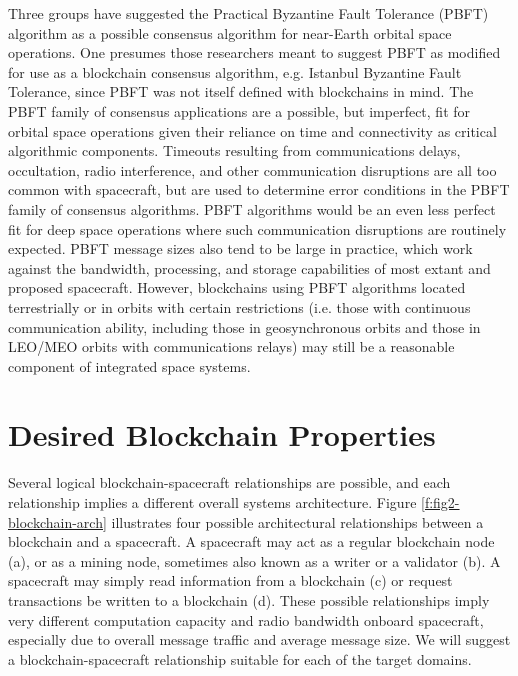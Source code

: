 \documentclass[]{aiaa-tc}%
\begin{document}
Three groups have suggested the Practical Byzantine Fault Tolerance (PBFT) algorithm\cite{castro_practical_1999} as a possible consensus algorithm for near-Earth orbital space operations\cite{yu_blockchain_2019,molesky_blockchain_2018,mital_blockchain_2019}. One presumes those researchers meant to suggest PBFT as modified for use as a blockchain consensus algorithm, e.g. Istanbul Byzantine Fault Tolerance\cite{lin_istanbul_2017}, since PBFT was not itself defined with blockchains in mind. The PBFT family of consensus applications are a 
possible, but imperfect, fit for orbital space operations given their reliance on time and connectivity as critical algorithmic components. Timeouts resulting from communications delays, occultation, radio interference, and other communication disruptions are all too common with spacecraft, but are used to determine error conditions in the PBFT family of consensus algorithms. PBFT algorithms would be an even less perfect fit for deep space operations where such communication disruptions are routinely expected. PBFT message sizes also tend to be large in practice, which work against the bandwidth, processing, and storage capabilities of most extant and proposed spacecraft. However, blockchains using PBFT algorithms located terrestrially or in orbits with certain restrictions (i.e. those with continuous communication ability, including those in geosynchronous orbits and those in LEO/MEO orbits with communications relays) may still be a reasonable component of integrated space systems.


\section{Desired Blockchain Properties}\label{sec:desiredproperties}

Several logical blockchain-spacecraft relationships are possible, and each relationship implies a different overall systems architecture. Figure \ref{f:fig2-blockchain-arch} illustrates four possible architectural relationships between a blockchain and a spacecraft. A spacecraft may act as a regular blockchain node (a), or as a mining node, sometimes also known as a writer or a 
validator
 (b). A spacecraft may simply read information from a blockchain (c) or request transactions be written to a blockchain (d). These possible relationships imply very different computation capacity and radio bandwidth onboard spacecraft, especially due to overall message traffic and average message size. We will suggest a blockchain-spacecraft relationship suitable for each of the target domains.
\end{document}
